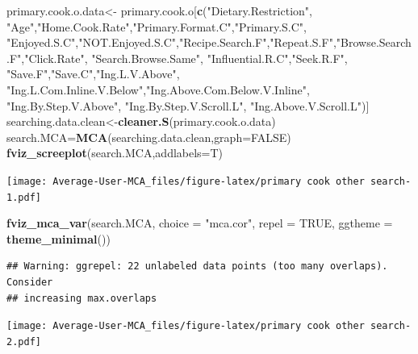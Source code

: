 \documentclass[
]{article}
\newenvironment{Shaded}{\begin{snugshade}}{\end{snugshade}}
\newcommand{\DataTypeTok}[1]{\textcolor[rgb]{0.13,0.29,0.53}{#1}}
\newcommand{\KeywordTok}[1]{\textcolor[rgb]{0.13,0.29,0.53}{\textbf{#1}}}
\newcommand{\NormalTok}[1]{#1}
\newcommand{\OtherTok}[1]{\textcolor[rgb]{0.56,0.35,0.01}{#1}}
\newcommand{\StringTok}[1]{\textcolor[rgb]{0.31,0.60,0.02}{#1}}
\begin{document}
\begin{Shaded}
\begin{Highlighting}[]
\NormalTok{primary.cook.o.data<-}\StringTok{ }\NormalTok{primary.cook.o[}\KeywordTok{c}\NormalTok{(}\StringTok{"Dietary.Restriction"}\NormalTok{, }\StringTok{"Age"}\NormalTok{,}\StringTok{"Home.Cook.Rate"}\NormalTok{,}\StringTok{"Primary.Format.C"}\NormalTok{,}\StringTok{"Primary.S.C"}\NormalTok{,}
            \StringTok{"Enjoyed.S.C"}\NormalTok{,}\StringTok{"NOT.Enjoyed.S.C"}\NormalTok{,}\StringTok{"Recipe.Search.F"}\NormalTok{,}\StringTok{"Repeat.S.F"}\NormalTok{,}\StringTok{"Browse.Search.F"}\NormalTok{,}\StringTok{"Click.Rate"}\NormalTok{,}
            \StringTok{"Search.Browse.Same"}\NormalTok{, }\StringTok{"Influential.R.C"}\NormalTok{,}\StringTok{"Seek.R.F"}\NormalTok{, }\StringTok{"Save.F"}\NormalTok{,}\StringTok{"Save.C"}\NormalTok{,}\StringTok{"Ing.L.V.Above"}\NormalTok{,}
            \StringTok{"Ing.L.Com.Inline.V.Below"}\NormalTok{,}\StringTok{"Ing.Above.Com.Below.V.Inline"}\NormalTok{,  }\StringTok{"Ing.By.Step.V.Above"}\NormalTok{,  }\StringTok{"Ing.By.Step.V.Scroll.L"}\NormalTok{,}
            \StringTok{"Ing.Above.V.Scroll.L"}\NormalTok{)]}
\NormalTok{searching.data.clean<-}\KeywordTok{cleaner.S}\NormalTok{(primary.cook.o.data)}
\NormalTok{search.MCA=}\KeywordTok{MCA}\NormalTok{(searching.data.clean,}\DataTypeTok{graph=}\OtherTok{FALSE}\NormalTok{)}
\KeywordTok{fviz_screeplot}\NormalTok{(search.MCA,}\DataTypeTok{addlabels=}\NormalTok{T)}
\end{Highlighting}
\end{Shaded}

\texttt{[image: Average-User-MCA\_files/figure-latex/primary cook other search-1.pdf]}

\begin{Shaded}
\begin{Highlighting}[]
\KeywordTok{fviz_mca_var}\NormalTok{(search.MCA, }\DataTypeTok{choice =} \StringTok{"mca.cor"}\NormalTok{, }\DataTypeTok{repel =} \OtherTok{TRUE}\NormalTok{,}
             \DataTypeTok{ggtheme =} \KeywordTok{theme_minimal}\NormalTok{())}
\end{Highlighting}
\end{Shaded}

\begin{verbatim}
## Warning: ggrepel: 22 unlabeled data points (too many overlaps). Consider
## increasing max.overlaps
\end{verbatim}

\texttt{[image: Average-User-MCA\_files/figure-latex/primary cook other search-2.pdf]}
\end{document}
